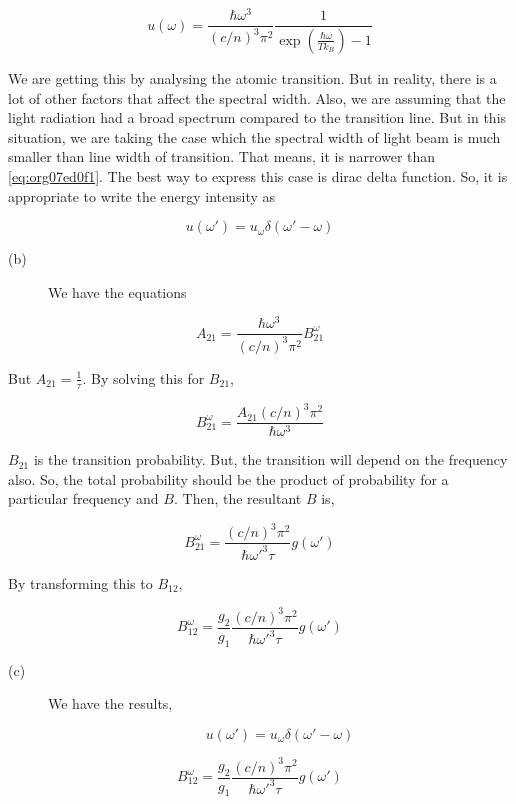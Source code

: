 \documentclass[a4paper,11pt]{article}
\begin{document}
\begin{equation}
\label{eq:org07ed0f1}
u(\omega) = \frac{\hbar \omega^3}{(c/n)^3 \pi^2}\frac{1}{\exp\left( \frac{\hbar \omega}{T k_B} \right) - 1}
\end{equation}

We are getting this by analysing the atomic transition. But in reality, there is a lot of other factors that affect the spectral width. Also, we are assuming that the light radiation had a broad spectrum compared to the transition line. But in this situation, we are taking the case which the 
spectral width of light beam is much smaller than line width of transition. That means, it is narrower than \ref{eq:org07ed0f1}. The best way to express this case is dirac delta function. So, it is appropriate to write the energy intensity as

$$u(\omega') = u_\omega\delta(\omega'-\omega)$$


\begin{description}
\item[{(b)}] We have the equations
\end{description}
\begin{equation}
A_{21} = \frac{\hbar \omega^3}{(c/n)^3 \pi^2}  B_{21}^{\omega}
\end{equation}

But \(A_{21}=\frac{1}{\tau}\). By solving this for \(B_{21}\),

\begin{equation}
B_{21}^{\omega} = \frac{A_{21}(c/n)^3 \pi^2}{\hbar \omega^3}
\end{equation}

\(B_{21}\) is the transition probability. But, the transition will depend on the frequency also. So, the total probability should be the product of probability for a particular frequency and \(B\). Then, the resultant \(B\) is,

\begin{equation}
\label{eq:orgfcf0a7f}
B_{21}^{\omega} = \frac{(c/n)^3 \pi^2}{\hbar \omega'^3\tau} g(\omega')
\end{equation}

By transforming this to \(B_{12}\),

\begin{equation}
B_{12}^{\omega} = \frac{g_2}{g_1}\frac{(c/n)^3 \pi^2}{\hbar \omega'^3\tau} g(\omega')
\end{equation}

\begin{description}
\item[{(c)}] We have the results, 

$$u(\omega') = u_\omega\delta(\omega'-\omega)$$
\end{description}
$$B_{12}^{\omega} = \frac{g_2}{g_1}\frac{(c/n)^3 \pi^2}{\hbar \omega'^3\tau} g(\omega')$$
\end{document}
